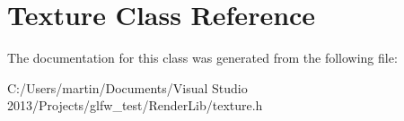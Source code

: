 \hypertarget{class_texture}{}\section{Texture Class Reference}
\label{class_texture}


The documentation for this class was generated from the following file\+:\begin{DoxyCompactItemize}
\item 
C\+:/\+Users/martin/\+Documents/\+Visual Studio 2013/\+Projects/glfw\+\_\+test/\+Render\+Lib/texture.\+h\end{DoxyCompactItemize}
